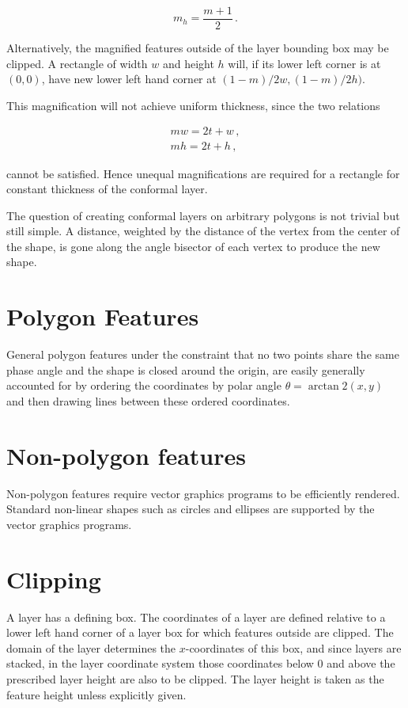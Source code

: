 \documentclass{article}
\begin{document}
$$m_h = \frac{m+1}{2} \,. $$

Alternatively, the magnified features outside of the layer bounding box may be clipped. A rectangle of width $w$ and height $h$ will, if its lower left corner is at $(0,0)$, have new lower left hand corner at $(1-m)/2 w, (1-m)/2 h)$.

This magnification will not achieve uniform thickness, since the two relations

\begin{align*}
    mw = 2t + w \,,\\
    mh = 2t + h \,,
\end{align*}

cannot be satisfied. Hence unequal magnifications are required for a rectangle for constant thickness of the conformal layer. 

The question of creating conformal layers on arbitrary polygons is not trivial but still simple. A distance, weighted by the distance of the vertex from the center of the shape, is gone along the angle bisector of each vertex to produce the new shape.

\section{Polygon Features}
General polygon features under the constraint that no two points share the same phase angle and the shape is closed around the origin, are easily generally accounted for by ordering the coordinates by polar angle $\theta = \arctan2(x,y)$ and then drawing lines between these ordered coordinates.

\section{Non-polygon features}
Non-polygon features require vector graphics programs to be efficiently rendered. Standard non-linear shapes such as circles and ellipses are supported by the vector graphics programs. 

\section{Clipping}
A layer has a defining box. The coordinates of a layer are defined relative to a lower left hand corner of a layer box for which features outside are clipped. The domain of the layer determines the $x$-coordinates of this box, and since layers are stacked, in the layer coordinate system those coordinates below 0 and above the prescribed layer height are also to be clipped. The layer height is taken as the feature height unless explicitly given.
\end{document}
